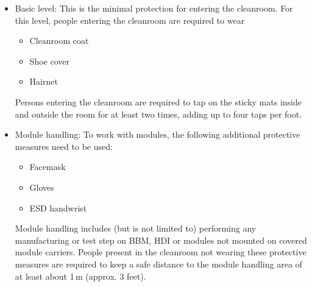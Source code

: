 \documentclass[12pt]{unlsilabsop}
\begin{document}
\begin{itemize}
    \item Basic level: This is the minimal protection for entering the cleanroom. For this level, people entering the cleanroom are required to wear
    \begin{itemize}
	\item Cleanroom coat
	\item Shoe cover
	\item Hairnet
    \end{itemize}
    Persons entering the cleanroom are required to tap on the sticky mats inside and outside the room for at least two times, adding up to four taps per foot.
    \item Module handling: To work with modules, the following additional protective measures need to be used:
    \begin{itemize}
	\item Facemask
	\item Gloves
	\item ESD handwrist
    \end{itemize}
    Module handling includes (but is not limited to) performing any manufacturing or test step on BBM, HDI or modules not mounted on covered module carriers. People present in the cleanroom not wearing these protective measures are required to keep a safe distance to the module handling area of at least about 1\,m (approx. 3 feet).
\end{itemize}
\end{document}
